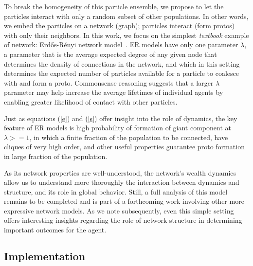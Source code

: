 \documentclass[sigconf]{acmart}
\begin{document}
To break the homogeneity of this particle ensemble, we propose to let the particles interact with only a random subset of other populations. In other words, we embed the particles on a network (graph); particles interact (form protos) with only their neighbors. In this work, we focus on the simplest \textit{textbook} example of network: Erd\H{o}s-R\'{e}nyi network model~\cite{newman2018networks}. ER models have only one parameter $\lambda$, a parameter that is the average expected degree of any given node that determines the density of connections in the network, and which in this setting determines the expected number of particles available for a particle to coalesce with and form a proto. Commonsense reasoning suggests that a larger $\lambda$ parameter may help increase the average lifetimes of individual agents by enabling greater likelihood of contact with other particles. 

Just as equations (\ref{e}) and (\ref{s}) offer insight into the role of dynamics, the key feature of ER models is high probability of formation of giant component at $\lambda>=1$, in which a finite fraction of the population to be connected, have cliques of very high order, and other useful properties guarantee proto formation in large fraction of the population.  

As its network properties are well-understood, the network's wealth dynamics allow us to understand more thoroughly the interaction between dynamics and structure, and its role in global behavior. Still, a full analysis of this model remains to be completed and is part of a forthcoming work involving other more expressive network models. As we note subsequently, even this simple setting offers interesting insights regarding the role of network structure in determining important outcomes for the agent. 


\subsection{Implementation}


\end{document}
